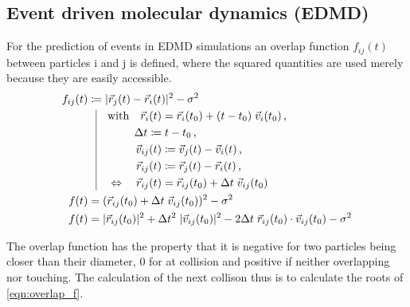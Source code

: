 \subsection{Event driven molecular dynamics (EDMD)}
\label{sec:EDMD}
For the prediction of events in EDMD simulations an overlap function $f_{ij}(t)$ between particles i and j is defined, where the squared quantities are used merely because they are easily accessible.\\
\begin{align}
f_{ij}(t) & \coloneqq  | \vec{r}_j(t) - \vec{r}_i(t) |^2 - \sigma^2\\
          & \; \; \, \vrule
  \begin{aligned}[t]
    \quad \text{with} \quad \vec{r}_i(t) &= \vec{r}_i(t_0) + (t-t_0) \; \vec{v}_i(t_0) \, \text{,}\\
    \Delta t \coloneqq & \; t-t_0  \, \text{,} \\ 
    \vec{v}_{ij}(t) &\coloneqq  \vec{v}_j(t) - \vec{v}_i(t) \, \text{,}\\
    \vec{r}_{ij}(t) &\coloneqq  \vec{r}_j(t) - \vec{r}_i(t) \, \text{,}\\
    \Leftrightarrow \quad \vec{r}_{ij}(t) &= \vec{r}_{ij}(t_0) + \Delta t \; \vec{v}_{ij}(t_0)
  \end{aligned}\\
f(t)  & = ( \vec{r}_{ij}(t_0) +  \Delta t \;  \vec{v}_{ij}(t_0))^2 -\sigma^2 \\
\label{eqn:overlap_f}
f(t)  & = |\vec{r}_{ij}(t_0)|^2 + \Delta t ^2 \; |\vec{v}_{ij}(t_0)|^2 - 2 \Delta t \; \vec{r}_{ij}(t_0) \cdot \vec{v}_{ij}(t_0)  -\sigma^2
\end{align}  

The overlap function has the property that it is negative for two particles being closer than their diameter, 0 for at collision and positive if neither overlapping nor touching. The calculation of the next collison thus is to calculate the roots of \autoref{eqn:overlap_f}.\\

